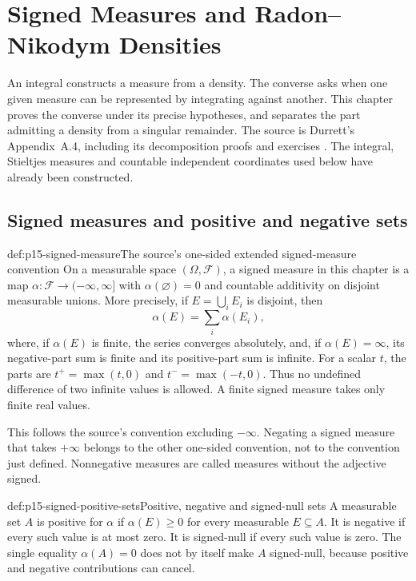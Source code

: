 \chapter{Signed Measures and Radon--Nikodym Densities}
\label{sec:p15-radon-nikodym}

An integral constructs a measure from a density. The converse asks when
one given measure can be represented by integrating against another.
This chapter proves the converse under its precise hypotheses, and
separates the part admitting a density from a singular remainder.
The source is Durrett's Appendix~A.4, including its decomposition
proofs and exercises \cite[pp.~466--470]{DurrettPTEAuthor2019}.
The integral, Stieltjes measures and countable independent coordinates
used below have already been constructed.

\section{Signed measures and positive and negative sets}
\label{sec:p15-signed-measures}

\begin{hbdefinition}{def:p15-signed-measure}{The source's one-sided extended signed-measure convention}
On a measurable space \((\Omega,\mathcal F)\), a signed measure in this
chapter is a map \(\alpha:\mathcal F\to(-\infty,\infty]\) with
\(\alpha(\varnothing)=0\) and countable additivity on disjoint measurable
unions. More precisely, if \(E=\bigcup_i E_i\) is disjoint, then
\[
                         \alpha(E)=\sum_i\alpha(E_i),
\]
where, if \(\alpha(E)\) is finite, the series converges absolutely,
and, if \(\alpha(E)=\infty\), its negative-part sum is finite and its
positive-part sum is infinite. For a scalar \(t\), the parts are
\(t^+=\max(t,0)\) and \(t^-=\max(-t,0)\).
Thus no undefined difference of two infinite values is allowed.
A finite signed measure takes only finite real values.

This follows the source's convention excluding \(-\infty\).
Negating a signed measure that takes \(+\infty\) belongs to the other
one-sided convention, not to the convention just defined.
Nonnegative measures are called measures without the adjective signed.
\end{hbdefinition}

\begin{hbdefinition}{def:p15-signed-positive-sets}{Positive, negative and signed-null sets}
A measurable set \(A\) is positive for \(\alpha\) if
\(\alpha(E)\geq0\) for every measurable \(E\subseteq A\).
It is negative if every such value is at most zero.
It is signed-null if every such value is zero.
The single equality \(\alpha(A)=0\) does not by itself make \(A\)
signed-null, because positive and negative contributions can cancel.
\end{hbdefinition}

